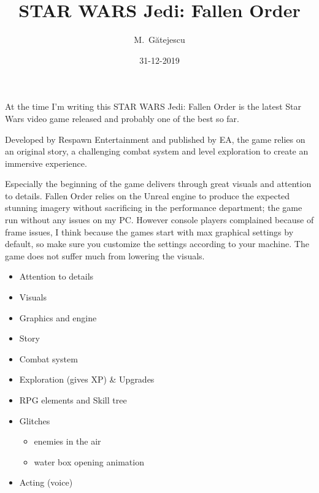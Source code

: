\documentclass[11pt]{article}
\author{M.~Gătejescu}
\date{31-12-2019}
\title{STAR WARS Jedi: Fallen Order}
\begin{document}
\maketitle

At the time I'm writing this STAR WARS Jedi: Fallen Order is the latest
Star Wars video game released and probably one of the best so far.

Developed by Respawn Entertainment and published by EA, the game relies
on an original story, a challenging combat system and level exploration
to create an immersive experience.

Especially the beginning of the game delivers through great visuals and
attention to details. Fallen Order relies on the Unreal engine to produce
the expected stunning imagery without sacrificing in the performance
department; the game run without any issues on my PC. However console
players complained because of frame issues, I think because the games
start with max graphical settings by default, so make sure you customize
the settings according to your machine. The game does not suffer much
from lowering the visuals.

\begin{itemize}
\item{Attention to details}
\item{Visuals}
\item{Graphics and engine}
\item{Story}
\item{Combat system}
\item{Exploration (gives XP) \& Upgrades}
\item{RPG elements and Skill tree}
\item{Glitches}
\begin{itemize}
\item{enemies in the air}
\item{water box opening animation}
\end{itemize}
\item{Acting (voice)}
\end{itemize}
\end{document}
